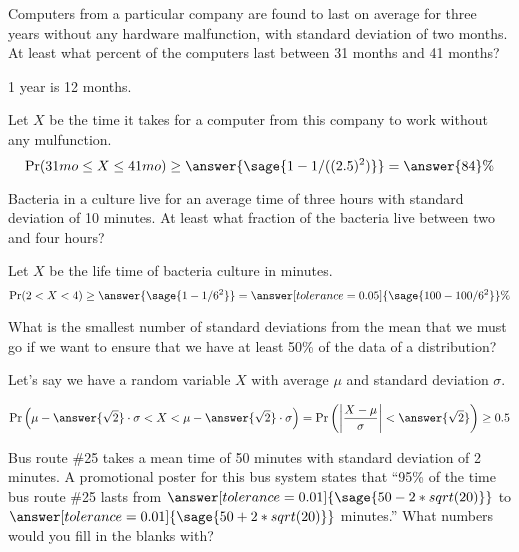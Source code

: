\documentclass{ximera}
\begin{document}
\begin{problem}
Computers from a particular company are found to last on average for three years without any hardware malfunction, with standard deviation of two months. At least what percent of the computers last between 31 months and 41 months?
\begin{hint}
1 year is 12 months.
\end{hint}
\begin{prompt}
Let $X$ be the time it takes  for a computer from this company to work without any mulfunction.
$$\Pr(31mo\leq X \leq 41mo)\geq\answer{\sage{1 - 1/((2.5)^2)}}=\answer{84}\%$$

\end{prompt}
\end{problem}



\begin{problem}
Bacteria in a culture live for an average time of three hours with standard deviation of 10 minutes. At least what fraction of the bacteria live between two and four hours?
\begin{prompt}
Let $X$ be the life time of bacteria culture in minutes.
$$\Pr(2<X<4)\geq \answer{ \sage{1-1/6^2}}=\answer[tolerance=0.05]{ \sage{100-100/6^2}}\%$$
\end{prompt}
\end{problem}


\begin{problem}
What is the smallest number of standard deviations from the mean that we must go if we want to ensure that we have at least 50\% of the data of a distribution?
\begin{prompt}
Let's say we have a random variable $X$ with average $\mu$ and standard deviation $\sigma$. 

$$\Pr\left(\mu-\answer{\sqrt{2}}\cdot \sigma< X < \mu-\answer{\sqrt{2}}\cdot \sigma \right)=\Pr\left(\left|\frac{X-\mu}{\sigma}\right|<\answer{\sqrt{2}}\right)\geq 0.5 $$
\end{prompt}
\end{problem}

\begin{problem}

Bus route \#25 takes a mean time of 50 minutes with standard deviation of 2 minutes. A promotional poster for this bus system states that ``95\% of the time bus route \#25 lasts from $\answer[tolerance=0.01]{\sage{50-2*sqrt(20)}}$ to $\answer[tolerance=0.01]{\sage{50+2*sqrt(20)}}$ minutes.'' What numbers would you fill in the blanks with?
\end{problem}
\end{document}
